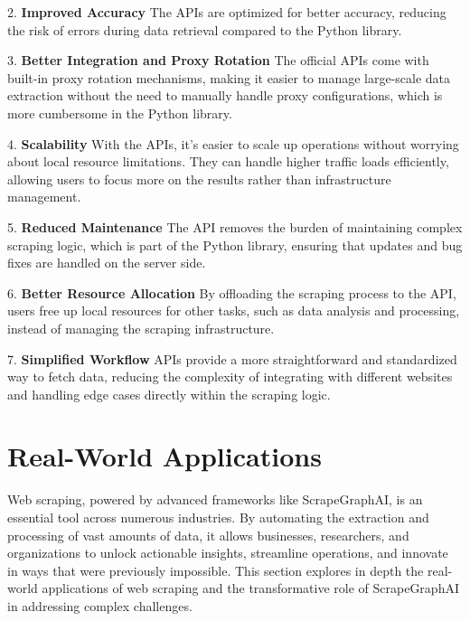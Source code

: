 2. \textbf{Improved Accuracy}  
   The APIs are optimized for better accuracy, reducing the risk of errors during data retrieval compared to the Python library.

3. \textbf{Better Integration and Proxy Rotation}  
   The official APIs come with built-in proxy rotation mechanisms, making it easier to manage large-scale data extraction without the need to manually handle proxy configurations, which is more cumbersome in the Python library.

4. \textbf{Scalability}  
   With the APIs, it's easier to scale up operations without worrying about local resource limitations. They can handle higher traffic loads efficiently, allowing users to focus more on the results rather than infrastructure management.

5. \textbf{Reduced Maintenance}  
   The API removes the burden of maintaining complex scraping logic, which is part of the Python library, ensuring that updates and bug fixes are handled on the server side.

6. \textbf{Better Resource Allocation}  
   By offloading the scraping process to the API, users free up local resources for other tasks, such as data analysis and processing, instead of managing the scraping infrastructure.

7. \textbf{Simplified Workflow}  
   APIs provide a more straightforward and standardized way to fetch data, reducing the complexity of integrating with different websites and handling edge cases directly within the scraping logic.

\section{Real-World Applications}

Web scraping, powered by advanced frameworks like ScrapeGraphAI, is an essential tool across numerous industries. By automating the extraction and processing of vast amounts of data, it allows businesses, researchers, and organizations to unlock actionable insights, streamline operations, and innovate in ways that were previously impossible. This section explores in depth the real-world applications of web scraping and the transformative role of ScrapeGraphAI in addressing complex challenges.

